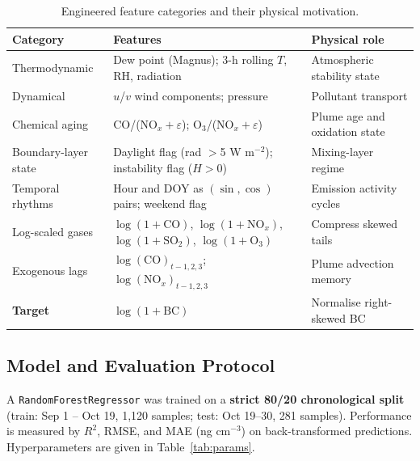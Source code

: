 \documentclass[11pt, a4paper]{article}
\begin{document}
\begin{table}[H]
\centering
\caption{Engineered feature categories and their physical motivation.}
\label{tab:feats}
\vspace{2pt}
\small
\begin{tabular}{p{2.8cm} p{6.0cm} p{4.0cm}}
\toprule
\textbf{Category}      & \textbf{Features}                                                & \textbf{Physical role}          \\
\midrule
Thermodynamic          & Dew point (Magnus); 3-h rolling $T$, RH, radiation              & Atmospheric stability state     \\
Dynamical              & $u$/$v$ wind components; pressure                               & Pollutant transport              \\
Chemical aging         & CO/($\mathrm{NO}_x{+}\varepsilon$); O$_3$/($\mathrm{NO}_x{+}\varepsilon$) & Plume age and oxidation state \\
Boundary-layer state   & Daylight flag (rad $>$5 W m$^{-2}$); instability flag ($H{>}0$)  & Mixing-layer regime             \\
Temporal rhythms       & Hour and DOY as $(\sin,\cos)$ pairs; weekend flag               & Emission activity cycles        \\
Log-scaled gases       & $\log(1{+}\mathrm{CO})$, $\log(1{+}\mathrm{NO}_x)$, $\log(1{+}\mathrm{SO}_2)$, $\log(1{+}\mathrm{O}_3)$ & Compress skewed tails \\
Exogenous lags         & $\log(\mathrm{CO})_{t-1,2,3}$; $\log(\mathrm{NO}_x)_{t-1,2,3}$  & Plume advection memory          \\
\midrule
\textbf{Target}        & $\log(1{+}\mathrm{BC})$                                          & Normalise right-skewed BC       \\
\bottomrule
\end{tabular}
\end{table}

\subsection{Model and Evaluation Protocol}

A \texttt{RandomForestRegressor} was trained on a \textbf{strict 80/20 chronological split}
(train: Sep 1 – Oct 19, 1{,}120 samples; test: Oct 19–30, 281 samples).
Performance is measured by $R^2$, RMSE, and MAE (ng cm$^{-3}$) on back-transformed
predictions. Hyperparameters are given in Table~\ref{tab:params}.
\end{document}

